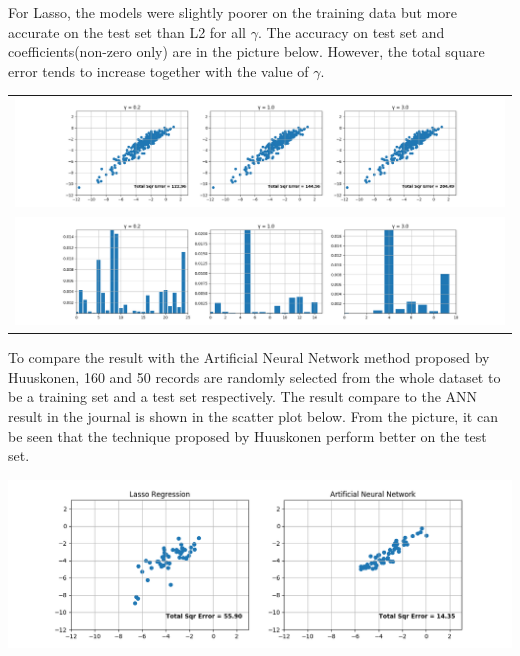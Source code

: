 \documentclass{article}
\begin{document}
For Lasso, the models were slightly poorer on the training data but more accurate on the test set than L2 for all $\gamma$. The accuracy on test set and coefficients(non-zero only) are in the picture below. However, the total square error tends to increase together with the value of $\gamma$.
\begin{center}
\begin{tabular}{c}
\includegraphics[scale=0.3]{lasso_solubility_acc}\\
\includegraphics[scale=0.3]{lasso_solubility_coeff}\\
\end{tabular}
\end{center}

To compare the result with the Artificial Neural Network method proposed by Huuskonen, 160 and 50 records are randomly selected from the whole dataset to be a training set and a test set respectively. The result compare to the ANN result in the journal is shown in the scatter plot below. From the picture, it can be seen that the technique proposed by Huuskonen perform better on the test set.
\begin{center}
\includegraphics[scale=0.4]{lasso_ann_compare}
\end{center}
\end{document}
